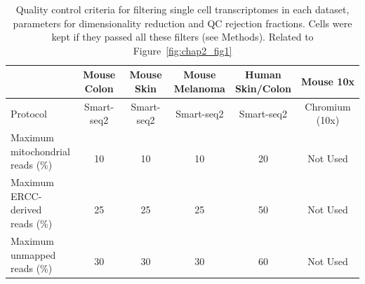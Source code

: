 \begin{table}[H]
\footnotesize
\caption{Quality control criteria for filtering single cell transcriptomes in each dataset, parameters for dimensionality reduction and QC rejection fractions. Cells were kept if they passed all these filters (see Methods). Related to Figure~\ref{fig:chap2_fig1}}
\centering
\label{table:tab_A_1}
\begin{tabular}{l|c c c c c}
\hline 
  & \specialcell[t]{Mouse\\Colon} & \specialcell[t]{Mouse\\Skin} & \specialcell[t]{Mouse\\Melanoma} & \specialcell[t]{Human\\Skin/Colon} & Mouse 10x\\
\hline
Protocol & Smart-seq2 & Smart-seq2 & Smart-seq2 & Smart-seq2 & Chromium (10x)\\

\specialcell[t]{Maximum\\mitochondrial\\reads (\%)} & \specialcell[t]{ \\10\\ } & \specialcell[t]{ \\10\\ } & \specialcell[t]{ \\10\\ } & \specialcell[t]{ \\20\\ } & \specialcell[t]{ \\Not Used\\ }\\

\specialcell[t]{Maximum\\ERCC-derived\\reads (\%)} & \specialcell[t]{ \\25\\ } & \specialcell[t]{ \\25\\ } & \specialcell[t]{ \\25\\ } & \specialcell[t]{ \\50\\ } & \specialcell[t]{ \\Not Used\\ }\\

\specialcell[t]{Maximum\\unmapped\\reads (\%)} & \specialcell[t]{ \\30\\ } & \specialcell[t]{ \\30\\ } & \specialcell[t]{ \\30\\ } & \specialcell[t]{ \\60\\ } & \specialcell[t]{ \\Not Used\\ }\\


\end{tabular}
\end{table}
